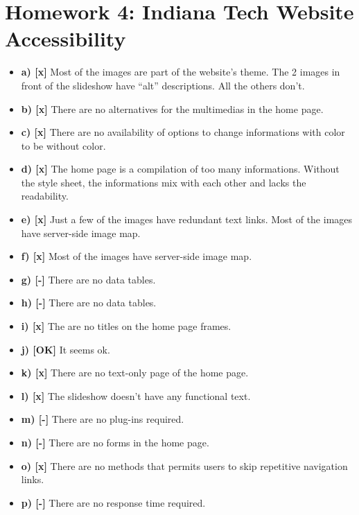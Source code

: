 \chapter{Homework 4: Indiana Tech Website Accessibility}
	\begin{itemize}
		\item{\textbf{a)	[x]} Most of the images are part of the website's theme. The 2 images in front of the slideshow have ``alt'' descriptions. All the others don't.}
		\item{\textbf{b)	[x]} There are no alternatives for the multimedias in the home page.}
		\item{\textbf{c)	[x]} There are no availability of options to change informations with color to be without color.}
		\item{\textbf{d)	[x]} The home page is a compilation of too many informations. Without the style sheet, the informations mix with each other and lacks the readability.}
		\item{\textbf{e)	[x]} Just a few of the images have redundant text links. Most of the images have server-side image map.}
		\item{\textbf{f)	[x]} Most of the images have server-side image map.}
		\item{\textbf{g)	[-]} There are no data tables.}
		\item{\textbf{h)	[-]} There are no data tables.}
		\item{\textbf{i)	[x]} The are no titles on the home page frames.}
		\item{\textbf{j)	[OK]} It seems ok.}
		\item{\textbf{k)	[x]} There are no text-only page of the home page.}
		\item{\textbf{l)	[x]} The slideshow doesn't have any functional text.}
		\item{\textbf{m)	[-]} There are no plug-ins required.}
		\item{\textbf{n)	[-]} There are no forms in the home page.}
		\item{\textbf{o)	[x]} There are no methods that permits users to skip repetitive navigation links.}
		\item{\textbf{p)	[-]} There are no response time required.}
	\end{itemize}
